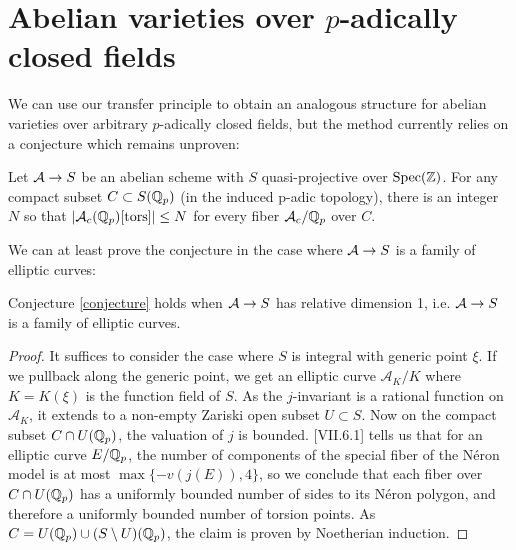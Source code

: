 \section{Abelian varieties over $p$-adically closed fields}
We can use our transfer principle to obtain an analogous structure for abelian varieties over arbitrary $p$-adically closed fields, but the method currently relies on a conjecture which remains unproven:

\begin{conjecture}
\label{conjecture}
Let $\mathcal{A}\rightarrow S$ be an abelian scheme with $S$ quasi-projective over $\operatorname{Spec}(\mathbb{Z})$. For any compact subset $C\subset S(\mathbb{Q}_p)$ (in the induced p-adic topology), there is an integer $N$ so that $|\mathcal{A}_c(\mathbb{Q}_p)[\operatorname{tors}]|\leq N$ for every fiber $\mathcal{A}_c/\mathbb{Q}_p$ over $C$.
\end{conjecture}

We can at least prove the conjecture in the case where $\mathcal{A}\rightarrow S$ is a family of elliptic curves:
\begin{proposition}
Conjecture \ref{conjecture} holds when $\mathcal{A}\rightarrow S$ has relative dimension 1, i.e. $\mathcal{A}\rightarrow S$ is a family of elliptic curves.
\end{proposition}
\begin{proof}
It suffices to consider the case where $S$ is integral with generic point $\xi$. If we pullback along the generic point, we get an elliptic curve $\mathcal{A}_K/K$ where $K=K(\xi)$ is the function field of $S$. As the $j$-invariant is a rational function on $\mathcal{A}_K$, it extends to a non-empty Zariski open subset $U\subset S$. Now on the compact subset $C\cap U(\mathbb{Q}_p)$, the valuation of $j$ is bounded. \cite{silverman2009arithmetic}[VII.6.1] tells us that for an elliptic curve $E/\mathbb{Q}_p$, the number of components of the special fiber of the N\'eron model is at most $\max\{-v(j(E)), 4\}$, so we conclude that each fiber over $C\cap U(\mathbb{Q}_p)$ has a uniformly bounded number of sides to its N\'eron polygon, and therefore a uniformly bounded number of torsion points. As $C=U(\mathbb{Q}_p)\cup (S\setminus U)(\mathbb{Q}_p)$, the claim is proven by Noetherian induction.
\end{proof}


